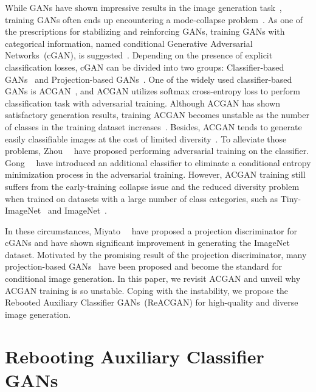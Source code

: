 \documentclass{article}
\begin{document}
While GANs have shown impressive results in the image generation task~\cite{Radford2016UnsupervisedRL, Nowozin2016fGANTG, Arjovsky2017WassersteinG, Gulrajani2017ImprovedTO}, training GANs often ends up encountering a mode-collapse problem~\cite{srivastava2017veegan, Arjovsky2017WassersteinG, Arjovsky2017TowardsPM}. As one of the prescriptions for stabilizing and reinforcing GANs, training GANs with categorical information, named conditional Generative Adversarial Networks~(cGAN), is suggested~\cite{Mirza2014ConditionalGA, Odena2017ConditionalIS, Miyato2018cGANsWP}. Depending on the presence of explicit classification losses, cGAN can be divided into two groups: Classifier-based GANs~\cite{Odena2017ConditionalIS, NIPS2019_8414, kang2020contragan, zhou2020omni, hou2021cgans} and Projection-based GANs~\cite{Miyato2018cGANsWP, Miyato2018SpectralNF, Brock2019LargeSG, Han_2021_ICCV}. One of the widely used classifier-based GANs is ACGAN~\cite{Odena2017ConditionalIS}, and ACGAN utilizes softmax cross-entropy loss to perform classification task with adversarial training. 
Although ACGAN has shown satisfactory generation results, training ACGAN becomes unstable as the number of classes in the training dataset increases~\cite{Miyato2018cGANsWP, kang2020contragan, zhou2020omni, hou2021cgans}. Besides, ACGAN tends to generate easily classifiable images at the cost of limited diversity~\cite{Odena2017ConditionalIS, Miyato2018cGANsWP, hou2021cgans}. To alleviate those problems, Zhou~\etal~\cite{zhou2018activation} have proposed performing adversarial training on the classifier. Gong~\etal~\cite{NIPS2019_8414} have introduced
an additional classifier to eliminate a conditional entropy minimization process in the adversarial training. However, ACGAN training still suffers from the early-training collapse issue and the reduced diversity problem when trained on datasets with a large number of class categories, such as Tiny-ImageNet~\cite{Tiny} and ImageNet~\cite{Deng2009ImageNetAL}.

In these circumstances, Miyato~\etal~\cite{Miyato2018cGANsWP} have proposed a projection discriminator for cGANs and have shown significant improvement in generating the ImageNet dataset. Motivated by the promising result of the projection discriminator, many projection-based GANs~\cite{Miyato2018SpectralNF, Zhang2019SelfAttentionGA, Brock2019LargeSG, Zhang2019ConsistencyRF, Wu2019LOGANLO, Zhao2020ImprovedCR} have been proposed and become the standard for conditional image generation. In this paper, we revisit ACGAN and unveil why ACGAN training is so unstable. Coping with the instability, we propose the Rebooted Auxiliary Classifier GANs~(ReACGAN) for high-quality and diverse image generation. \section{Rebooting Auxiliary Classifier GANs}
\label{sec:ACGAN}
\end{document}
